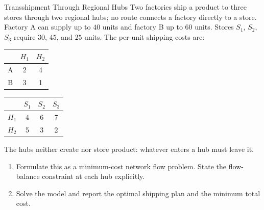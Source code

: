\begin{ex}{Transshipment Through Regional Hubs}{}
\label{ex:transshipment-hubs}
 Two factories ship a product to three stores through two regional hubs; no route connects a factory directly to a store.  Factory A can supply up to $40$ units and factory B up to $60$ units.  Stores $S_1$, $S_2$, $S_3$ require $30$, $45$, and $25$ units.  The per-unit shipping costs are:
\begin{center}
\begin{tabular}{c|c|c}
 & $H_1$ & $H_2$ \\
\hline
A & 2 & 4 \\
B & 3 & 1 \\
\end{tabular}
\qquad
\begin{tabular}{c|c|c|c}
 & $S_1$ & $S_2$ & $S_3$ \\
\hline
$H_1$ & 4 & 6 & 7 \\
$H_2$ & 5 & 3 & 2 \\
\end{tabular}
\par{}\label{tab:modeling-sums-continued-tab05}%

\end{center}
The hubs neither create nor store product: whatever enters a hub must leave it.
\begin{enumerate}
\item Formulate this as a minimum-cost network flow problem.  State the flow-balance constraint at each hub explicitly.
\item Solve the model and report the optimal shipping plan and the minimum total cost.
\end{enumerate}
\exrefs{\S\ref{sec:min-cost-network-flow}}
\end{ex}

